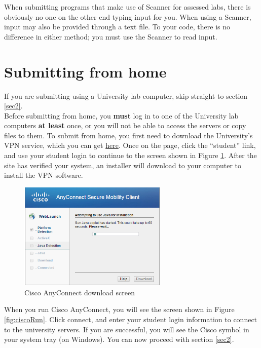 \documentclass[]{article}
\begin{document}
When submitting programs that make use of Scanner for assessed labs, there is obviously no one on the other end typing input for you. When using a Scanner, input may also be provided through a text file. To your code, there is no difference in either method; you must use the Scanner to read input.

\section{Submitting from home}
\label{sec1}
If you are submitting using a University lab computer, skip straight to section \ref{sec2}.\\

Before submitting from home, you \textbf{must} log in to one of the University lab computers \textbf{at least} once, or you will not be able to access the servers or copy files to them. To submit from home, you first need to download the University's VPN service, which you can get \href{https://its.unimelb.edu.au/help/networks-access/networks-internet/vpn/installing-anyconnect}{here}. Once on the page, click the ``student'' link, and use your student login to continue to the screen shown in Figure \ref{fig:ciscoDownload}. After the site has verified your system, an installer will download to your computer to install the VPN software.\\

\begin{figure}[!h]
	\centering
	\includegraphics[width=200pt]{Images/CiscoDownload}
	\caption{Cisco AnyConnect download screen}
	\label{fig:ciscoDownload}
\end{figure}

When you run Cisco AnyConnect, you will see the screen shown in Figure \ref{fig:ciscoRun}. Click connect, and enter your student login information to connect to the university servers. If you are successful, you will see the Cisco symbol in your system tray (on Windows). You can now proceed with section \ref{sec2}.
\end{document}

